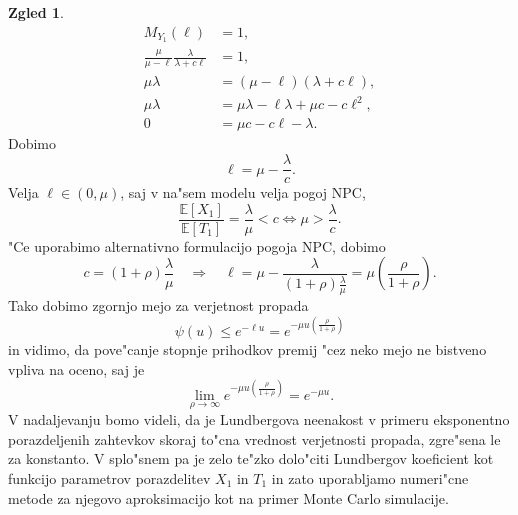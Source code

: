 \documentclass[12pt, a4paper, reqno]{amsart}
\theoremstyle{definition}
\newtheorem{zgled}[definicija]{Zgled}
\theoremstyle{plain}
\newcommand{\E}{\mathbb{E}}
\newcommand{\1}{\mathds{1}}
\begin{document}
\begin{zgled}
                \begin{align*}
                    M_{Y_1}(\ell) &= 1, \\
                    \frac{\mu}{\mu - \ell}\frac{\lambda}{\lambda + c\ell} &= 1, \\
                    \mu\lambda &= (\mu - \ell)(\lambda + c\ell), \\
                    \mu\lambda &= \mu\lambda - \ell\lambda + \mu c - c\ell^2, \\
                    0 &= \mu c - c\ell - \lambda.
                \end{align*}
                Dobimo 
                \begin{equation}
                    \ell = \mu - \frac{\lambda}{c}.
                    \label{eq:LundbergovKoeficientExpPrva}
                \end{equation}
                Velja $\ell \in (0, \mu)$, saj v na"sem modelu velja pogoj NPC,
                \begin{equation*}
                    \frac{\E\left[X_1\right]}{\E\left[T_1\right]} = \frac{\lambda}{\mu} < c \iff \mu > \frac{\lambda}{c}.
                \end{equation*}
                "Ce uporabimo alternativno formulacijo pogoja NPC, dobimo
                \begin{equation}
                    c = (1 + \rho)\frac{\lambda}{\mu} \quad \Rightarrow \quad
                    \ell = \mu - \frac{\lambda}{(1 + \rho)\frac{\lambda}{\mu}} = \mu\left(\frac{\rho}{1 + \rho}\right).
                    \label{eq:LundbergovKoeficientExp}
                \end{equation}
                Tako dobimo zgornjo mejo za verjetnost propada
                \begin{equation*}
                    \psi(u) \leq e^{-\ell u} = e^{-\mu u\left(\frac{\rho}{1 + \rho}\right)}
                \end{equation*}
                in vidimo, da pove"canje stopnje prihodkov premij "cez neko mejo ne bistveno 
                vpliva na oceno, saj je
                \begin{equation*}
                    \lim_{\rho\to\infty}e^{-\mu u\left(\frac{\rho}{1 + \rho}\right)} = e^{-\mu u}.
                \end{equation*}
                V nadaljevanju bomo videli, da je Lundbergova neenakost v primeru eksponentno 
                porazdeljenih zahtevkov skoraj to"cna vrednost verjetnosti propada, zgre"sena le za konstanto.
                V splo"snem pa je zelo te"zko dolo"citi Lundbergov koeficient kot funkcijo parametrov
                porazdelitev $X_1$ in $T_1$ in zato uporabljamo numeri"cne metode za njegovo aproksimacijo 
                kot na primer Monte Carlo simulacije. 
                \label{zgd:LundebrgovaNeenakostEksponentno}
            \end{zgled}
\end{document}
